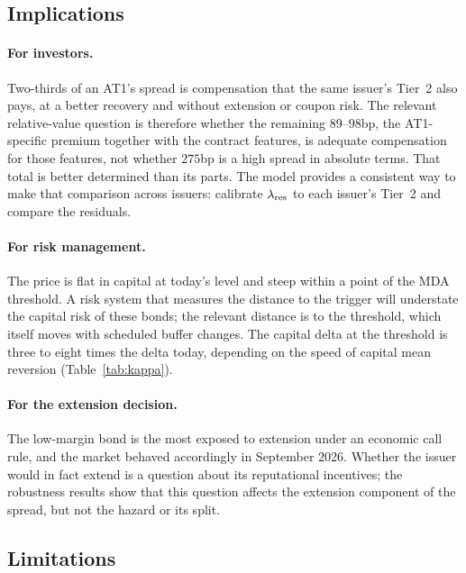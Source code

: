 \subsection{Implications}

\paragraph{For investors.} Two-thirds of an AT1's spread is compensation that the same
issuer's Tier~2 also pays, at a better recovery and without extension or coupon risk. The
relevant relative-value question is therefore whether the remaining $89$--$98$bp, the
AT1-specific premium together with the contract features, is adequate compensation for
those features, not whether $275$bp is a high spread in absolute terms. That total is
better determined than its parts. The model provides a consistent way to
make that comparison across issuers: calibrate $\lambda_{\mathrm{res}}$ to each issuer's Tier~2 and compare the
residuals.

\paragraph{For risk management.} The price is flat in capital at today's level and steep
within a point of the MDA threshold. A risk system that measures the distance to the trigger
will understate the capital risk of these bonds; the relevant distance is to the threshold,
which itself moves with scheduled buffer changes. The capital delta at the threshold is
three to eight times the delta today, depending on the speed of capital mean reversion
(Table~\ref{tab:kappa}).

\paragraph{For the extension decision.} The low-margin bond is the most exposed to extension
under an economic call rule, and the market behaved accordingly in September 2026. Whether
the issuer would in fact extend is a question about its reputational incentives; the
robustness results show that this question affects the extension component of the spread,
but not the hazard or its split.

\subsection{Limitations}

